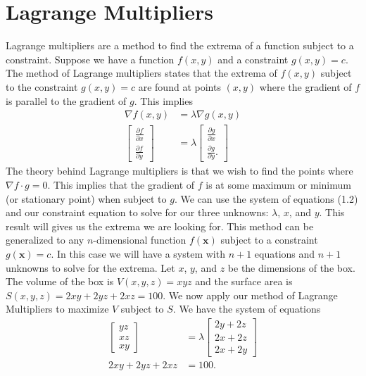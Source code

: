 \section{Lagrange Multipliers}
\noindent Lagrange multipliers are a method to find the extrema of a function subject to a constraint. 
Suppose we have a function $f(x,y)$ and a constraint $g(x,y) = c$. 
The method of Lagrange multipliers states that the extrema of $f(x,y)$ subject to the constraint $g(x,y) = c$ are found at points $(x,y)$ where the gradient of $f$ is parallel to the gradient of $g$.
This implies
\begin{align}
    \nabla f(x,y) &= \lambda \nabla g(x,y) \\
    \begin{bmatrix}
        \frac{\partial f}{\partial x} \\
        \frac{\partial f}{\partial y}
    \end{bmatrix} &= \lambda \begin{bmatrix}
        \frac{\partial g}{\partial x} \\
        \frac{\partial g}{\partial y}.
    \end{bmatrix}
\end{align}
The theory behind Lagrange multipliers is that we wish to find the points where $\nabla f \cdot g = 0$.
This implies that the gradient of $f$ is at some maximum or minimum (or stationary point) when subject to $g$.
We can use the system of equations (1.2) and our constraint equation to solve for our three unknowns: $\lambda$, $x$, and $y$.
This result will gives us the extrema we are looking for. 
This method can be generalized to any $n$-dimensional function $f(\mathbf{x})$ subject to a constraint $g(\mathbf{x}) = c$.
In this case we will have a system with $n+1$ equations and $n+1$ unknowns to solve for the extrema.
\noindent Let $x$, $y$, and $z$ be the dimensions of the box.
The volume of the box is $V(x,y,z) = xyz$ and the surface area is $S(x,y,z) = 2xy + 2yz + 2xz = 100$.
We now apply our method of Lagrange Multipliers to maximize $V$ subject to $S$. 
We have the system of equations
\begin{align*}
    \begin{bmatrix}
        yz \\
        xz \\
        xy
    \end{bmatrix} &= \lambda \begin{bmatrix}
        2y + 2z \\
        2x + 2z \\
        2x + 2y
    \end{bmatrix} \\
    2xy + 2yz + 2xz &= 100.
\end{align*}

